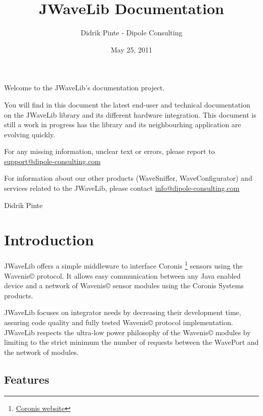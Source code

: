 \documentclass[a4paper,10pt,english]{sphinxmanual}
\title{JWaveLib Documentation}
\date{May 25, 2011}
\author{Didrik Pinte - Dipole Consulting}
\begin{document}
\maketitle
\tableofcontents
{}\label{index::doc}


Welcome to the JWaveLib's documentation project.

You will find in this document the latest end-user and technical documentation
on the JWaveLib library and its different hardware integration. This document
is still a work in progress has the library and its neighbourhing application
are evolving quickly.

For any missing information, unclear text or errors, please report to \href{mailto:support@dipole-consulting.com}{support@dipole-consulting.com}

For information about our other products (WaveSniffer, WaveConfigurator) and services related to the JWaveLib,
please contact \href{mailto:info@dipole-consulting.com}{info@dipole-consulting.com}

Didrik Pinte


\chapter{Introduction}
\label{introduction:introduction}\label{introduction::doc}\label{introduction:jwavelib-s-documentation}
JWaveLib offers a simple middleware to interface Coronis \footnote{
\href{http://www.coronis.com}{Coronis website}
} sensors using the Wavenis© protocol. It allows easy communication between any Java enabled device and a network of Wavenis© sensor modules using the Coronis Systems products.

JWaveLib focuses on integrator needs by decreasing their development time, assuring code quality and fully tested Wavenis© protocol implementation. JWaveLib respects the ultra-low power philosophy of the Wavenis© modules by limiting to the strict minimum the number of requests between the WavePort and the network of modules.


\section{Features}
\label{introduction:features}
\end{document}

